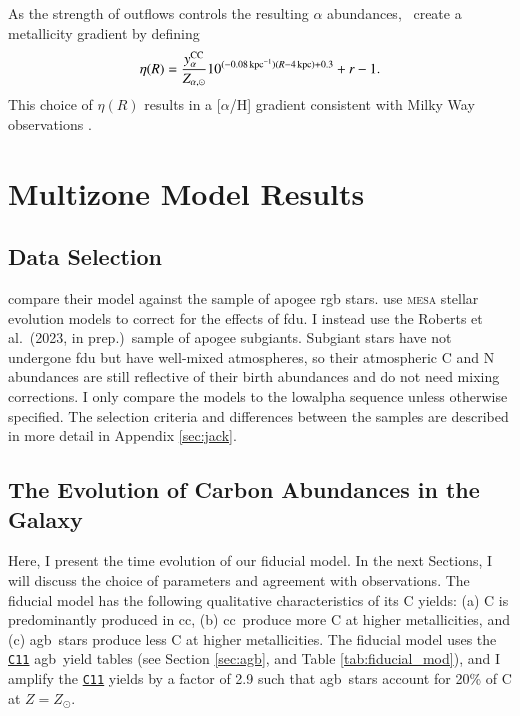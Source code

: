 \documentclass[12pt,oneside,letterpaper]{report}
\newcommand{\cc}{\gls{cc}}
\newcommand{\agb}{\gls{agb}}
\newcommand{\apogee}{\gls{apogee}}
\newcommand{\citetjack}{Roberts et al.~(2023, in prep.)}
\newcommand{\cxi}{\texttt{\hyperlink{C11}{C11}}}
\newcommand{\JJ}{\citetalias{james+21}}
\begin{document}
As the strength of outflows controls the resulting $\alpha$ abundances, \JJ~create a metallicity gradient by defining
\begin{equation}\label{eq:eta_r}
\eta(R) = \frac{y_{\alpha}^{\rm CC}}{Z_{\alpha, \odot}} 10^{(-0.08\,\text{kpc}^{-1})(R-4\,\text{kpc})+0.3} + r - 1.
\end{equation}
This choice of $\eta(R)$ results in a [$\alpha$/H] gradient consistent with Milky Way observations \citep[e.g.][]{hayden+14, weinberg+19, frinchaboy+13}.


\chapter{Multizone Model Results}
\section{Data Selection}

\citet{james+23} compare their model against the \cite{vincenzo+21} sample of \apogee{} \citep{apogee17} \gls{rgb} stars. \citet{vincenzo+21} use \textsc{mesa} stellar evolution models \citep{mesa} to correct for the effects of \gls{fdu}. 
I instead use the \citetjack~sample of \apogee{} \gls{subgiant}s. Subgiant stars have not undergone \gls{fdu} but have well-mixed atmospheres, so their atmospheric C and N abundances are still reflective of their birth abundances and do not need mixing corrections. I only compare the models to the \gls{lowalpha} sequence unless otherwise specified.  The selection criteria and differences between the samples are described in more detail in Appendix \ref{sec:jack}.



\section{The Evolution of Carbon Abundances in the Galaxy}

Here, I present the time evolution of our fiducial model. In the next Sections, I will discuss the choice of parameters and agreement with observations. 
The fiducial model has the following qualitative characteristics of its C yields: (a) C is predominantly produced in \cc, (b) \cc\ produce more C at higher metallicities, and (c) \agb\ stars produce less C at higher metallicities. The fiducial model uses the \cxi{} \agb\ yield tables (see Section \ref{sec:agb}, and Table \ref{tab:fiducial_mod}), and I amplify the \cxi{} yields by a factor of 2.9 such that \agb\ stars account for 20\% of C at $Z=Z_\odot$. 
\end{document}
